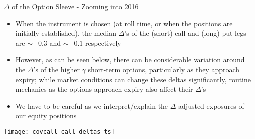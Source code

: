 \documentclass{beamer}
\begin{document}
\begin{frame}{$\Delta$ of the Option Sleeve - Zooming into 2016}

\begin{center}
\begin{block}{}
\fontsize{7pt}{7.2}\selectfont
\begin{itemize}
\item When the instrument is chosen (at roll time, or when the positions are initially established), the median $\Delta$'s of the (short) call and (long) put legs are $\sim -0.3$ and $\sim -0.1$ respectively
\item However, as can be seen below, there can be considerable variation around the $\Delta$'s of the higher $\gamma$ short-term options, particularly as they approach expiry; while market conditions can change these deltas significantly, routine mechanics as the options approach expiry also affect their $\Delta$'s
\item We have to be careful as we interpret/explain the $\Delta$-adjusted exposures of our equity positions

\end{itemize}

\end{block}

\texttt{[image: covcall\_call\_deltas\_ts]}
\end{center}
\end{frame}
\end{document}
